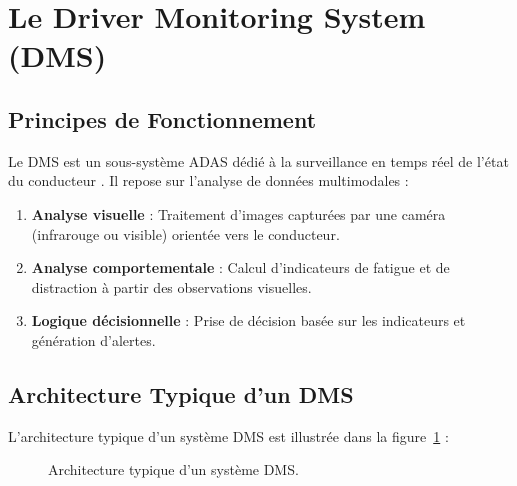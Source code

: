 \section{Le Driver Monitoring System (DMS)}

\subsection{Principes de Fonctionnement}

Le DMS est un sous-système ADAS dédié à la surveillance en temps réel de l'état du conducteur \cite{dinion2019}. Il repose sur l'analyse de données multimodales :

\begin{enumerate}[leftmargin=2cm]
    \item \textbf{Analyse visuelle} : Traitement d'images capturées par une caméra (infrarouge ou visible) orientée vers le conducteur.
    \item \textbf{Analyse comportementale} : Calcul d'indicateurs de fatigue et de distraction à partir des observations visuelles.
    \item \textbf{Logique décisionnelle} : Prise de décision basée sur les indicateurs et génération d'alertes.
\end{enumerate}

\subsection{Architecture Typique d'un DMS}

L'architecture typique d'un système DMS est illustrée dans la figure~\ref{fig:dms_archi_typique} :

\begin{figure}[H]
\centering
{}
\caption{Architecture typique d'un système DMS.}
\label{fig:dms_archi_typique}
\end{figure}

